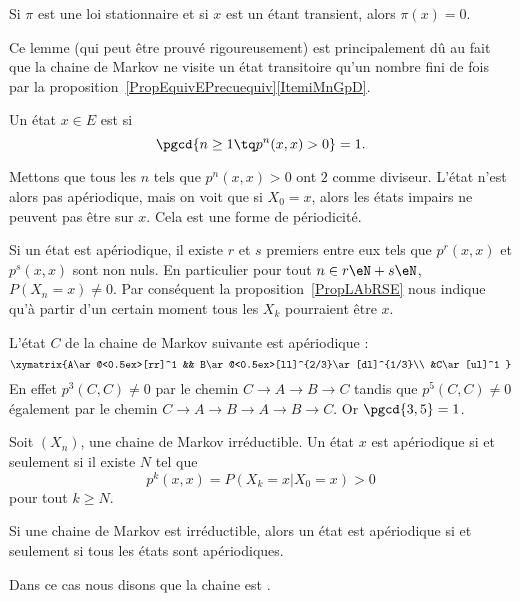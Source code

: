 \begin{lemma}
	Si \( \pi\) est une loi stationnaire et si \( x\) est un étant transient, alors \( \pi(x)=0\).
\end{lemma}
Ce lemme (qui peut être prouvé rigoureusement) est principalement dû au fait que la chaine de Markov ne visite un état transitoire qu'un nombre fini de fois par la proposition~\ref{PropEquivEPrecuequiv}\ref{ItemiMnGpD}.

\begin{definition}  \label{DefCxvOaT}
	Un état \( x\in E\) est  si
	\begin{equation}
		\pgcd\{ n\geq 1\tq p^n(x,x)>0 \}=1.
	\end{equation}
\end{definition}
Mettons que tous les \( n\) tels que \( p^n(x,x)>0\) ont \( 2\) comme diviseur. L'état n'est alors pas apériodique, mais on voit que si \( X_0=x\), alors les états impairs ne peuvent pas être sur \( x\). Cela est une forme de périodicité.

Si un état est apériodique, il existe \( r\) et \( s\) premiers entre eux tels que \( p^r(x,x)\) et \( p^s(x,x)\) sont non nuls. En particulier pour tout \( n\in r\eN+s\eN\), \( P(X_n=x)\neq 0\). Par conséquent la proposition~\ref{PropLAbRSE} nous indique qu'à partir d'un certain moment tous les \( X_k\) pourraient être \( x\).

L'état \( C\) de la chaine de Markov suivante est apériodique :
\begin{equation}
	\xymatrix{%
		A\ar@<0.5ex>[rr]^1  && B\ar@<0.5ex>[ll]^{2/3}\ar[dl]^{1/3}\\
		&C\ar[ul]^1
	}
\end{equation}
En effet \( p^3(C,C)\neq 0\) par le chemin \( C\to A\to B\to C\) tandis que \( p^5(C,C)\neq 0\) également par le chemin \( C\to A\to B\to A\to B\to C\). Or \( \pgcd\{ 3,5 \}=1\).

\begin{proposition}     \label{PropSaOysS}
	Soit \( (X_n)\), une chaine de Markov irréductible. Un état \( x\) est apériodique si et seulement si il existe \( N\) tel que
	\begin{equation}
		p^k(x,x)=P(X_k=x|X_0=x)>0
	\end{equation}
	pour tout \( k\geq N\).
\end{proposition}

\begin{propositionDef}		\label{DEFooBNBVooBuWQqi}
	Si une chaine de Markov est irréductible, alors un état est apériodique si et seulement si tous les états sont apériodiques.

	Dans ce cas nous disons que la chaine est .
\end{propositionDef}

